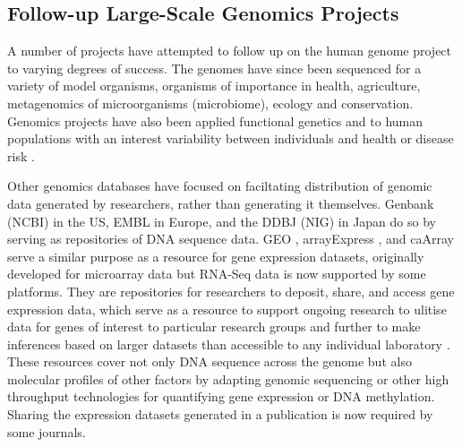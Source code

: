 
\subsection{Follow-up Large-Scale Genomics Projects}
A number of projects have attempted to follow up on the human genome project to varying degrees of success. The genomes have since been sequenced for a variety of model organisms, organisms of importance in health, agriculture, metagenomics of microorganisms (microbiome), ecology and conservation. Genomics projects have also been applied functional genetics \citep{ENCODE2004, FANTOM2001} and to human populations with an interest variability between individuals and health or disease risk \citep{HapMap2003, 1000Genomes2010}.


Other genomics databases have focused on faciltating distribution of genomic data generated by researchers, rather than generating it themselves. Genbank (NCBI) in the US, EMBL in Europe, and the DDBJ (NIG) in Japan do so by serving as repositories of DNA sequence data. GEO \citep{GEO2016}, arrayExpress \citep{ArrayExpress2013}, and caArray \citep{caArray2014} serve a similar purpose as a resource for gene expression datasets, originally developed for microarray data but RNA-Seq data is now supported by some platforms. They are repositories for researchers to deposit, share, and access gene expression data, which serve as a resource to support ongoing research to ulitise data for genes of interest to particular research groups and further to make inferences based on larger datasets than accessible to any individual laboratory \citep{Rung2013}. These resources cover not only DNA sequence across the genome but also molecular profiles of other factors by adapting genomic sequencing or other high throughput technologies for quantifying gene expression or DNA methylation. Sharing the expression datasets generated in a publication is now required by some journals.

